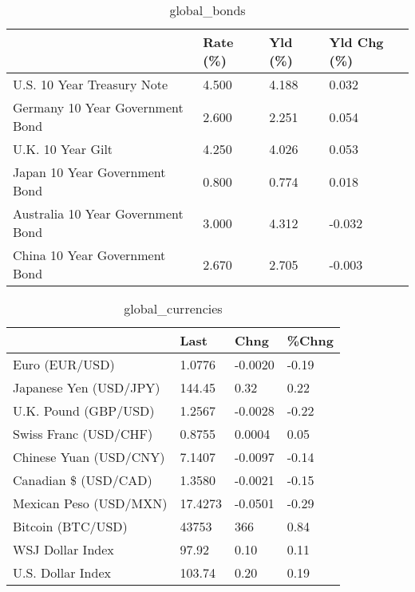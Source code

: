 \documentclass{article}%
\begin{document}
%


\begin{table}[htbp]%
\caption{global\_bonds}%
\centering%
\begin{adjustbox}{width=1\textwidth}%
\begin{tabular}{llll}
\toprule
                                  & Rate (\%) & Yld (\%) & Yld Chg (\%) \\
\midrule
       U.S. 10 Year Treasury Note &    4.500 &   4.188 &       0.032 \\
  Germany 10 Year Government Bond &    2.600 &   2.251 &       0.054 \\
                U.K. 10 Year Gilt &    4.250 &   4.026 &       0.053 \\
    Japan 10 Year Government Bond &    0.800 &   0.774 &       0.018 \\
Australia 10 Year Government Bond &    3.000 &   4.312 &      -0.032 \\
    China 10 Year Government Bond &    2.670 &   2.705 &      -0.003 \\
\bottomrule
\end{tabular}
%
\end{adjustbox}%
\end{table}

%


\begin{table}[htbp]%
\caption{global\_currencies}%
\centering%
\begin{adjustbox}{width=1\textwidth}%
\begin{tabular}{llll}
\toprule
                       &    Last &    Chng & \%Chng \\
\midrule
        Euro (EUR/USD) &  1.0776 & -0.0020 & -0.19 \\
Japanese Yen (USD/JPY) &  144.45 &    0.32 &  0.22 \\
  U.K. Pound (GBP/USD) &  1.2567 & -0.0028 & -0.22 \\
 Swiss Franc (USD/CHF) &  0.8755 &  0.0004 &  0.05 \\
Chinese Yuan (USD/CNY) &  7.1407 & -0.0097 & -0.14 \\
  Canadian \$ (USD/CAD) &  1.3580 & -0.0021 & -0.15 \\
Mexican Peso (USD/MXN) & 17.4273 & -0.0501 & -0.29 \\
     Bitcoin (BTC/USD) &   43753 &     366 &  0.84 \\
      WSJ Dollar Index &   97.92 &    0.10 &  0.11 \\
     U.S. Dollar Index &  103.74 &    0.20 &  0.19 \\
\bottomrule
\end{tabular}
%
\end{adjustbox}%
\end{table}
\end{document}
